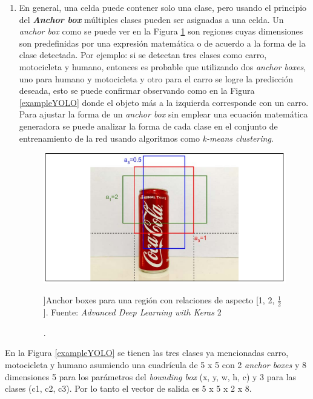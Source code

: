 \begin{enumerate}
    \item En general, una celda puede contener solo una clase, pero usando el principio del \textbf{\textit{Anchor box}} múltiples clases pueden ser asignadas a una celda. Un \textit{anchor box} como se puede ver en la Figura \ref{anchor_boxes} son regiones cuyas dimensiones son predefinidas por una expresión matemática o de acuerdo a la forma de la clase detectada. Por ejemplo: si se detectan tres clases como carro, motocicleta y humano, entonces es probable que utilizando dos \textit{anchor boxes}, uno para humano y motocicleta y otro para el carro se logre la predicción deseada, esto se puede confirmar observando como en la Figura \ref{exampleYOLO} donde el objeto más a la izquierda corresponde con un carro. Para ajustar la forma de un \textit{anchor box} sin emplear una ecuación matemática generadora se puede analizar la forma de cada clase en el conjunto de entrenamiento de la red usando algoritmos como \textit{k-means clustering}\cite[p~191]{Krishnendu}.
    \begin{figure}[H]
        \centering
        \includegraphics[scale=0.7]{Recursos/anchor_boxes.png}
        \caption[Anchor boxes para una región con relaciones de aspecto [1, 2, $\frac{1}{2}$].]{Anchor boxes para una región con relaciones de aspecto [1, 2, $\frac{1}{2}$]. {\footnotesize Fuente: \textit{Advanced Deep Learning with Keras} \cite[p.~376]{Atienza2018}}}
2        \label{anchor_boxes}
    \end{figure}
\end{enumerate}
En la Figura \ref{exampleYOLO} se tienen las tres clases ya mencionadas carro, motocicleta y humano asumiendo una cuadrícula de 5 x 5 con 2 \textit{anchor boxes} y 8 dimensiones 5 para los parámetros del \textit{bounding box} (x, y, w, h, c) y 3 para las clases (c1, c2, c3). Por lo tanto el vector de salida es 5 x 5 x 2 x 8.
